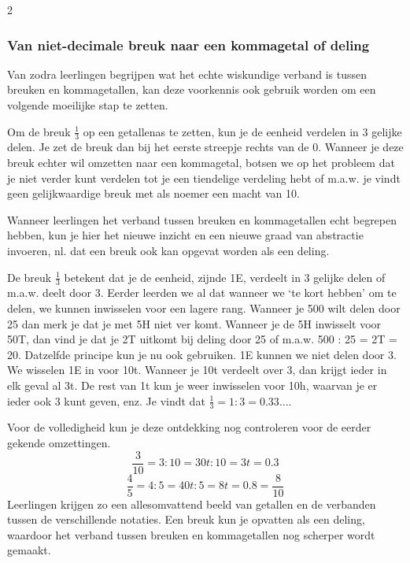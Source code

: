 \begin{multicols}{2}

\subsubsection*{Van niet-decimale breuk naar een kommagetal of deling}

Van zodra leerlingen begrijpen wat het echte wiskundige verband is tussen breuken en kommagetallen, kan deze voorkennis ook gebruik worden om een volgende moeilijke stap te zetten.

Om de breuk \(\frac{1}{3}\) op een getallenas te zetten, kun je de eenheid verdelen in 3 gelijke delen.
Je zet de breuk dan bij het eerste streepje rechts van de 0.
Wanneer je deze breuk echter wil omzetten naar een kommagetal, botsen we op het probleem dat je niet verder kunt verdelen tot je een tiendelige verdeling hebt of m.a.w. je vindt geen gelijkwaardige breuk met als noemer een macht van 10.

Wanneer leerlingen het verband tussen breuken en kommagetallen echt begrepen hebben, kun je hier het nieuwe inzicht en een nieuwe graad van abstractie invoeren, nl. dat een breuk ook kan opgevat worden als een deling.

De breuk \(\frac{1}{3}\) betekent dat je de eenheid, zijnde 1E, verdeelt in 3 gelijke delen of m.a.w. deelt door 3.
Eerder leerden we al dat wanneer we `te kort hebben' om te delen, we kunnen inwisselen voor een lagere rang.
Wanneer je 500 wilt delen door 25 dan merk je dat je met 5H niet ver komt.
Wanneer je de 5H inwisselt voor 50T, dan vind je dat je 2T uitkomt bij deling door 25 of m.a.w. 500 : 25 = 2T = 20.
Datzelfde principe kun je nu ook gebruiken.
1E kunnen we niet delen door 3.
We wisselen 1E in voor 10t.
Wanneer je 10t verdeelt over 3, dan krijgt ieder in elk geval al 3t.
De rest van 1t kun je weer inwisselen voor 10h, waarvan je er ieder ook 3 kunt geven, enz.
Je vindt dat \(\frac{1}{3} = 1 : 3 = \num{0.33}\ldots\).

Voor de volledigheid kun je deze ontdekking nog controleren voor de eerder gekende omzettingen.
\[
\frac{3}{10} = 3 : 10 = 30 t : 10 = 3 t = \num{0.3}
\]
\[
\frac{4}{5} = 4 : 5 = 40 t : 5 = 8 t = \num{0.8} = \frac{8}{10}
\]
Leerlingen krijgen zo een allesomvattend beeld van getallen en de verbanden tussen de verschillende notaties.
Een breuk kun je opvatten als een deling, waardoor het verband tussen breuken en kommagetallen nog scherper wordt gemaakt.


\end{multicols}
